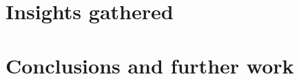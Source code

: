 \documentclass[runningheads]{llncs}
\begin{document}
\section{Insights gathered}\label{sec:ins}
\section{Conclusions and further work}\label{sec:con}
%
%
%


%
% 
% 
% 
% 
\end{document}
